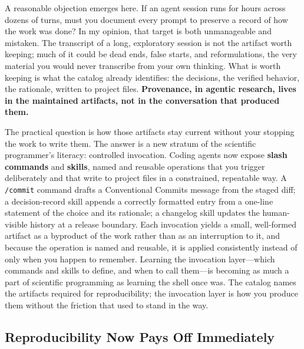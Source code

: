 \documentclass{IEEEcsmag}
\begin{document}
A reasonable objection emerges here. If an agent session runs for hours across dozens of turns, must you document every prompt to preserve a record of how the work was done? In my opinion, that target is both unmanageable and mistaken. The transcript of a long, exploratory session is not the artifact worth keeping; much of it could be dead ends, false starts, and reformulations, the very material you would never transcribe from your own thinking. What is worth keeping is what the catalog already identifies: the decisions, the verified behavior, the rationale, written to project files. \textbf{Provenance, in agentic research, lives in the maintained artifacts, not in the conversation that produced them.}

The practical question is how those artifacts stay current without your stopping the work to write them. The answer is a new stratum of the scientific programmer's literacy: controlled invocation. Coding agents now expose \textbf{slash commands} and \textbf{skills}, named and reusable operations that you trigger deliberately and that write to project files in a constrained, repeatable way. A \texttt{/commit} command drafts a Conventional Commits message from the staged diff; a decision-record skill appends a correctly formatted entry from a one-line statement of the choice and its rationale; a changelog skill updates the human-visible history at a release boundary. Each invocation yields a small, well-formed artifact as a byproduct of the work rather than as an interruption to it, and because the operation is named and reusable, it is applied consistently instead of only when you happen to remember. Learning the invocation layer---which commands and skills to define, and when to call them---is becoming as much a part of scientific programming as learning the shell once was. The catalog names the artifacts required for reproducibility; the invocation layer is how you produce them without the friction that used to stand in the way.

\subsection{Reproducibility Now Pays Off Immediately}
\end{document}
